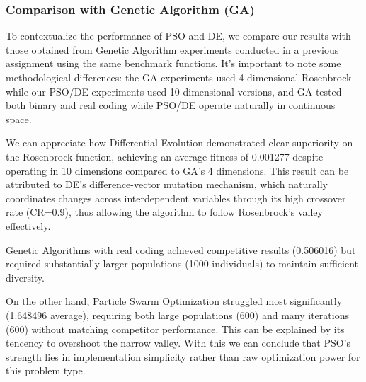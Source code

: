 \documentclass[12pt,a4paper]{article}
\begin{document}
\subsubsection{Comparison with Genetic Algorithm (GA)}
To contextualize the performance of PSO and DE, we compare our results with those obtained from Genetic Algorithm experiments conducted in a previous assignment using the same benchmark functions. It's important to note some methodological differences: the GA experiments used 4-dimensional Rosenbrock while our PSO/DE experiments used 10-dimensional versions, and GA tested both binary and real coding while PSO/DE operate naturally in continuous space.

\begin{table}[H]
\centering
{}
\caption{Performance comparison on Rosenbrock function.}
\end{table}


We can appreciate how Differential Evolution demonstrated clear superiority on the Rosenbrock function, achieving an average fitness of 0.001277 despite operating in 10 dimensions compared to GA's 4 dimensions. 
This result can be attributed to DE's difference-vector mutation mechanism, which naturally coordinates changes across interdependent variables through its high crossover rate (CR=0.9), thus allowing the algorithm to follow Rosenbrock's valley effectively.

Genetic Algorithms with real coding achieved competitive results (0.506016) but required substantially larger populations (1000 individuals) to maintain sufficient diversity.

On the other hand, Particle Swarm Optimization struggled most significantly (1.648496 average), requiring both large populations (600) and many iterations (600) without matching competitor performance. 
This can be explained by its tencency to overshoot the narrow valley. 
With this we can conclude that PSO's strength lies in implementation simplicity rather than raw optimization power for this problem type.
\end{document}

